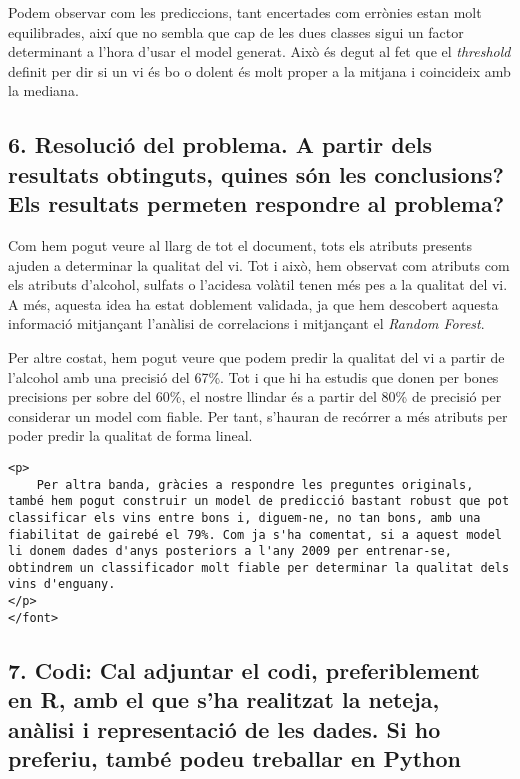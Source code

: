 \documentclass[11pt]{article}
\begin{document}
     Podem observar com les prediccions, tant encertades com errònies estan
molt equilibrades, així que no sembla que cap de les dues classes sigui
un factor determinant a l'hora d'usar el model generat. Això és degut al
fet que el \emph{threshold} definit per dir si un vi és bo o dolent és
molt proper a la mitjana i coincideix amb la mediana.

    \hypertarget{resolucio-del-problema.-a-partir-dels-resultats-obtinguts-quines-son-les-conclusions-els-resultats-permeten-respondre-al-problema}{%
\subsection{6. Resolució del problema. A partir dels resultats
obtinguts, quines són les conclusions? Els resultats permeten respondre
al
problema?}\label{resolucio-del-problema.-a-partir-dels-resultats-obtinguts-quines-son-les-conclusions-els-resultats-permeten-respondre-al-problema}}

    Com hem pogut veure al llarg de tot el document, tots els atributs
presents ajuden a determinar la qualitat del vi. Tot i això, hem
observat com atributs com els atributs d'alcohol, sulfats o l'acidesa
volàtil tenen més pes a la qualitat del vi. A més, aquesta idea ha estat
doblement validada, ja que hem descobert aquesta informació mitjançant
l'anàlisi de correlacions i mitjançant el \emph{Random Forest}.

Per altre costat, hem pogut veure que podem predir la qualitat del vi a
partir de l'alcohol amb una precisió del 67\%. Tot i que hi ha estudis
que donen per bones precisions per sobre del 60\%, el nostre llindar és
a partir del 80\% de precisió per considerar un model com fiable. Per
tant, s'hauran de recórrer a més atributs per poder predir la qualitat
de forma lineal.

\begin{verbatim}
<p>
    Per altra banda, gràcies a respondre les preguntes originals, també hem pogut construir un model de predicció bastant robust que pot classificar els vins entre bons i, diguem-ne, no tan bons, amb una fiabilitat de gairebé el 79%. Com ja s'ha comentat, si a aquest model li donem dades d'anys posteriors a l'any 2009 per entrenar-se, obtindrem un classificador molt fiable per determinar la qualitat dels vins d'enguany.
</p>
</font>
\end{verbatim}

    \hypertarget{codi-cal-adjuntar-el-codi-preferiblement-en-r-amb-el-que-sha-realitzat-la-neteja-analisi-i-representacio-de-les-dades.-si-ho-preferiu-tambe-podeu-treballar-en-python}{%
\subsection{7. Codi: Cal adjuntar el codi, preferiblement en R, amb el
que s'ha realitzat la neteja, anàlisi i representació de les dades. Si
ho preferiu, també podeu treballar en
Python}\label{codi-cal-adjuntar-el-codi-preferiblement-en-r-amb-el-que-sha-realitzat-la-neteja-analisi-i-representacio-de-les-dades.-si-ho-preferiu-tambe-podeu-treballar-en-python}}
\end{document}
